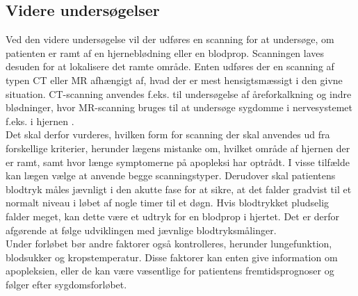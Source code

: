 \subsection{Videre undersøgelser}
Ved den videre undersøgelse vil der udføres en scanning for at undersøge, om patienten er ramt af en hjerneblødning eller en blodprop. Scanningen laves desuden for at lokalisere det ramte område. Enten udføres der en scanning af typen CT eller MR afhængigt af, hvad der er mest hensigtsmæssigt i den givne situation. \cite{Sundhedsstyrelsen2009} %
CT-scanning anvendes f.eks. til undersøgelse af åreforkalkning og indre blødninger, hvor MR-scanning bruges til at undersøge sygdomme i nervesystemet f.eks. i hjernen \cite{Hansen2015,Ammundsen2015}.\\
Det skal derfor vurderes, hvilken form for scanning der skal anvendes ud fra forskellige kriterier, herunder lægens mistanke om, hvilket område af hjernen der er ramt, samt hvor længe symptomerne på apopleksi har optrådt. I visse tilfælde kan lægen vælge at anvende begge scanningstyper.  
Derudover skal patientens blodtryk måles jævnligt i den akutte fase for at sikre, at det falder gradvist til et normalt niveau i løbet af nogle timer til et døgn. Hvis blodtrykket pludselig falder meget, kan dette være et udtryk for en blodprop i hjertet. Det er derfor afgørende at følge udviklingen med jævnlige blodtryksmålinger. \cite{Sundhedsstyrelsen2009}
\\
Under forløbet bør andre faktorer også kontrolleres, herunder lungefunktion, blodsukker og kropstemperatur. Disse faktorer kan enten give information om apopleksien, eller de kan være væsentlige for patientens fremtidsprognoser og følger efter sygdomsforløbet. \cite{Sundhedsstyrelsen2009}
\\

